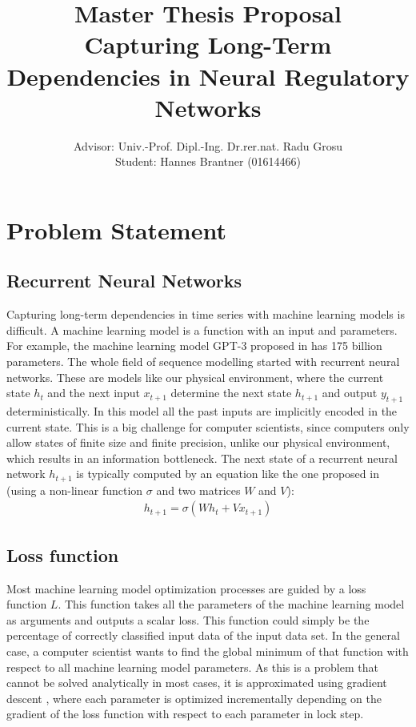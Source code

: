 \documentclass{article}
\begin{document}
\title{\textbf{Master Thesis Proposal}\\Capturing Long-Term Dependencies in Neural Regulatory Networks}
\author{Advisor: Univ.-Prof. Dipl.-Ing. Dr.rer.nat. Radu Grosu\\Student: Hannes Brantner (01614466)}
\maketitle{}
\section{Problem Statement}
\subsection{Recurrent Neural Networks}
Capturing long-term dependencies in time series with machine learning models is difficult. 
A machine learning model is a function with an input and parameters.
For example, the machine learning model GPT-3 proposed in \cite{GPT-3} has 175 billion parameters.
The whole field of sequence modelling started with recurrent neural networks. 
These are models like our physical environment, where the current state $h_{t}$ and the next input $x_{t+1}$ determine the next state $h_{t+1}$ and output $y_{t+1}$ deterministically. 
In this model all the past inputs are implicitly encoded in the current state. 
This is a big challenge for computer scientists, since computers only allow states of finite size and finite precision, unlike our physical environment, which results in an information bottleneck. 
The next state of a recurrent neural network $h_{t+1}$ is typically computed by an equation like the one proposed in \cite{UnitaryRNNs} (using a non-linear function $\sigma$ and two matrices $W$ and $V$):
\begin{align} \label{rnn_state_update}
    h_{t+1} = \sigma(Wh_t + Vx_{t+1})
\end{align}
\subsection{Loss function}
Most machine learning model optimization processes are guided by a loss function $L$. 
This function takes all the parameters of the machine learning model as arguments and outputs a scalar loss.
This function could simply be the percentage of correctly classified input data of the input data set. 
In the general case, a computer scientist wants to find the global minimum of that function with respect to all machine learning model parameters.
As this is a problem that cannot be solved analytically in most cases, it is approximated using gradient descent \cite{GradientDescent}, where each parameter is optimized incrementally depending on the gradient of the loss function with respect to each parameter in lock step.
\end{document}
